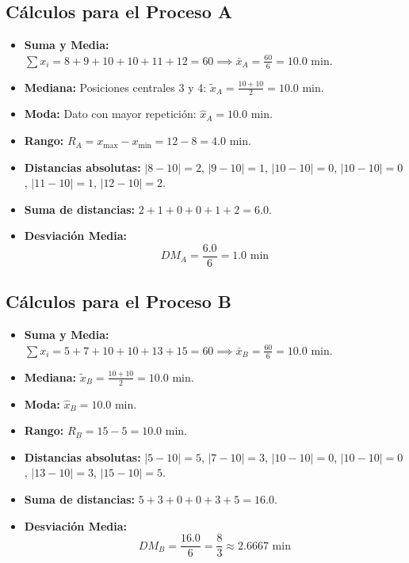 \documentclass[spanish,letterpaper,oneside]{article}
\begin{document}
\subsection{Cálculos para el Proceso A}
\begin{itemize}
	\item \textbf{Suma y Media:} $\sum x_i = 8+9+10+10+11+12 = 60 \implies \bar{x}_A = \frac{60}{6} = 10.0\text{ min}$.
	\item \textbf{Mediana:} Posiciones centrales 3 y 4: $\tilde{x}_A = \frac{10+10}{2} = 10.0\text{ min}$.
	\item \textbf{Moda:} Dato con mayor repetición: $\hat{x}_A = 10.0\text{ min}$.
	\item \textbf{Rango:} $R_A = x_{\max} - x_{\min} = 12 - 8 = 4.0\text{ min}$.
	\item \textbf{Distancias absolutas:} $|8-10|=2$, $|9-10|=1$, $|10-10|=0$, $|10-10|=0$, $|11-10|=1$, $|12-10|=2$.
	\item \textbf{Suma de distancias:} $2 + 1 + 0 + 0 + 1 + 2 = 6.0$.
	\item \textbf{Desviación Media:}
	\begin{equation*}
		DM_A = \frac{6.0}{6} = 1.0\text{ min}
	\end{equation*}
\end{itemize}

\subsection{Cálculos para el Proceso B}
\begin{itemize}
	\item \textbf{Suma y Media:} $\sum x_i = 5+7+10+10+13+15 = 60 \implies \bar{x}_B = \frac{60}{6} = 10.0\text{ min}$.
	\item \textbf{Mediana:} $\tilde{x}_B = \frac{10+10}{2} = 10.0\text{ min}$.
	\item \textbf{Moda:} $\hat{x}_B = 10.0\text{ min}$.
	\item \textbf{Rango:} $R_B = 15 - 5 = 10.0\text{ min}$.
	\item \textbf{Distancias absolutas:} $|5-10|=5$, $|7-10|=3$, $|10-10|=0$, $|10-10|=0$, $|13-10|=3$, $|15-10|=5$.
	\item \textbf{Suma de distancias:} $5 + 3 + 0 + 0 + 3 + 5 = 16.0$.
	\item \textbf{Desviación Media:}
	\begin{equation*}
		DM_B = \frac{16.0}{6} = \frac{8}{3} \approx 2.6667\text{ min}
	\end{equation*}
\end{itemize}
\end{document}
